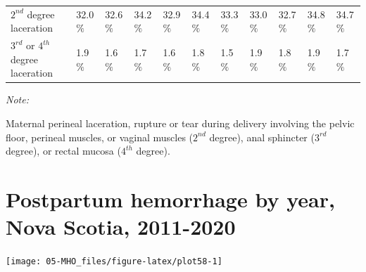 \documentclass[
]{krantz}
\begin{document}
\begin{table}[H]
{\begin{threeparttable}
\begin{tabular}[t]{lllllllllll}
$2^{nd}$ degree laceration & 32.0$\%$ & 32.6$\%$ & 34.2$\%$ & 32.9$\%$ & 34.4$\%$ & 33.3$\%$ & 33.0$\%$ & 32.7$\%$ & 34.8$\%$ & 34.7$\%$\\
$3^{rd}$ or $4^{th}$ degree laceration & 1.9$\%$ & 1.6$\%$ & 1.7$\%$ & 1.6$\%$ & 1.8$\%$ & 1.5$\%$ & 1.9$\%$ & 1.8$\%$ & 1.9$\%$ & 1.7$\%$\\
\bottomrule
\end{tabular}
\begin{tablenotes}
\item \textit{Note: } 
\item Maternal perineal laceration, rupture or tear during delivery involving the pelvic floor, perineal muscles, or vaginal muscles ($2^{nd}$ degree), anal sphincter ($3^{rd}$ degree), or rectal mucosa ($4^{th}$ degree).
\end{tablenotes}
\end{threeparttable}}
\end{table}

\hypertarget{section-58}{%
\section{Postpartum hemorrhage by year, Nova Scotia, 2011-2020}\label{section-58}}

\begin{center}\texttt{[image: 05-MHO\_files/figure-latex/plot58-1]} \end{center}

\begin{table}[H]
\centering
{}
\end{table}
\end{document}
